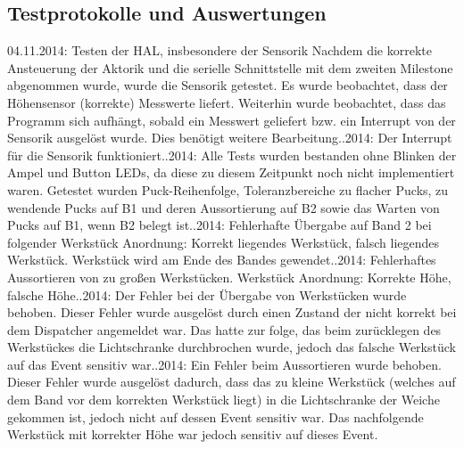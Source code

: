 \documentclass[oneside,a4paper,titlepage]{scrartcl}              %
\begin{document}
\subsection{Testprotokolle und Auswertungen}
04.11.2014: Testen der HAL, insbesondere der Sensorik\newline
Nachdem die korrekte Ansteuerung der Aktorik und die serielle Schnittstelle mit dem zweiten Milestone abgenommen wurde, wurde die Sensorik getestet. Es wurde beobachtet, dass der Höhensensor (korrekte) Messwerte liefert. Weiterhin wurde beobachtet, dass das Programm sich aufhängt, sobald ein Messwert geliefert bzw. ein Interrupt von der Sensorik ausgelöst wurde. Dies benötigt weitere Bearbeitung.\newline{}.2014: Der Interrupt für die Sensorik funktioniert.\newline{}.2014: Alle Tests wurden bestanden ohne Blinken der Ampel und Button LEDs, da diese zu diesem Zeitpunkt noch nicht implementiert waren. Getestet wurden Puck-Reihenfolge, Toleranzbereiche zu flacher Pucks, zu wendende Pucks auf B1 und deren Aussortierung auf B2 sowie das Warten von Pucks auf B1, wenn B2 belegt ist.\newline{}.2014: Fehlerhafte Übergabe auf Band 2 bei folgender Werkstück Anordnung: Korrekt liegendes Werkstück, falsch liegendes Werkstück. Werkstück wird am Ende des Bandes gewendet.\newline{}.2014: Fehlerhaftes Aussortieren von zu großen Werkstücken. Werkstück Anordnung: Korrekte Höhe, falsche Höhe.\newline{}.2014: Der Fehler bei der Übergabe von Werkstücken wurde behoben. Dieser Fehler wurde ausgelöst durch einen Zustand der nicht korrekt bei dem Dispatcher
angemeldet war. Das hatte zur folge, das beim zurücklegen des Werkstückes die Lichtschranke durchbrochen wurde, jedoch das falsche Werkstück auf das Event sensitiv war.\newline{}.2014: Ein Fehler beim Aussortieren wurde behoben. Dieser Fehler wurde ausgelöst dadurch, dass das zu kleine Werkstück (welches auf dem Band vor dem korrekten Werkstück liegt)
in die Lichtschranke der Weiche gekommen ist, jedoch nicht auf dessen Event sensitiv war. Das nachfolgende Werkstück mit korrekter Höhe war jedoch sensitiv auf dieses Event.
\end{document}
